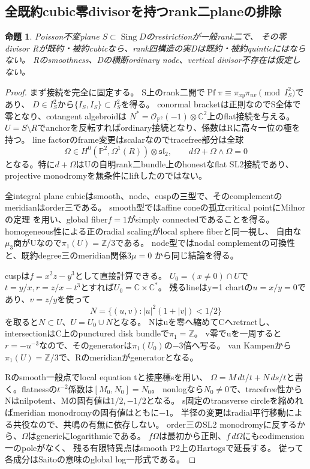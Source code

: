 \documentclass[a4paper,11pt]{ltjsarticle}
\newtheorem{proposition}{命題}[section]
\theoremstyle{definition}
\begin{document}
\subsection{全既約cubic零divisorを持つrank二planeの排除}
\begin{proposition}\label{prop:rank2-plane-integral-cubic}
Poisson不変plane $S\subset\operatorname{Sing}D$のrestrictionが一般rank二で、
その零divisor Rが既約・被約cubicなら、rank四構造の実Dは既約・被約quinticにはならない。
Rのsmoothness、Dの横断ordinary node、vertical divisor不存在は仮定しない。
\end{proposition}
\begin{proof}
まず接続を完全に固定する。
S上のrank二開で$\operatorname{Pf}\pi\equiv\pi_{xy}\pi_{uv}\pmod{I_S^2}$であり、
$D\in I_S^2$から$\{I_S,I_S\}\subset I_S^2$を得る。
conormal bracketは正則なのでS全体で零となり、cotangent algebroidは
$N^*=\mathcal O_{\mathbb P^2}(-1)\otimes\mathbb C^2$上のflat接続を与える。
$U=S\setminus R$でanchorを反転すればordinary接続となり、係数はRに高々一位の極を持つ。
line factorのframe変更はscalarなのでtracefree部分は全球
\[
 \Omega\in H^0(\mathbb P^2,\Omega^1(R))\otimes\mathfrak{sl}_2,
 \qquad d\Omega+\Omega\wedge\Omega=0
\]
となる。特に$d+\Omega$はUの自明rank二bundle上のhonestなflat SL2接続であり、
projective monodromyを無条件にliftしたのではない。

全integral plane cubicはsmooth、node、cuspの三型で、そのcomplementのmeridianはorder三である。
smooth型ではaffine coneの孤立critical pointにMilnorの定理\cite[Theorem 6.5, pp.57--58]{milnor}
を用い、global fiber$f=1$がsimply connectedであることを得る。
homogeneous性による正のradial scalingがlocal sphere fiberと同一視し、
自由な$\mu_3$商がUなので$\pi_1(U)=\mathbb Z/3$である。
node型ではnodal complementの可換性と、既約degree三のmeridian関係$3\mu=0$
\cite[\S3, Proposition 3.1の証明, pp.5--6]{artaldimca}から同じ結論を得る。

cuspは$f=x^2z-y^3$として直接計算できる。
$U_0=(x\ne0)\cap U$で$t=y/x,r=z/x-t^3$とすれば$U_0=\mathbb C\times\mathbb C^*$。
残るlineはy=1 chartの$u=x/y=0$であり、$v=z/y$を使って
\[
 N=\{(u,v):|u|^2(1+|v|)<1/2\}
\]
を取ると$N\subset U$、$U=U_0\cup N$となる。
Nはuを零へ縮めてCへretractし、intersectionはC上のpunctured disk bundleで$\pi_1=\mathbb Z$。
v零でuを一周すると$r=-u^{-3}$なので、そのgeneratorは$\pi_1(U_0)$の$-3$倍へ写る。
van Kampenから$\pi_1(U)=\mathbb Z/3$で、Rのmeridianがgeneratorとなる。

Rのsmooth一般点でlocal equation tと接座標sを用い、
$\Omega=M\,dt/t+N\,ds/t$と書く。flatnessの$t^{-2}$係数は$[M_0,N_0]=N_0$。
nonlogなら$N_0\ne0$で、tracefree性からNはnilpotent、Mの固有値は$1/2,-1/2$となる。
s固定のtransverse circleを縮めればmeridian monodromyの固有値はともに$-1$。
半径の変更はradial平行移動による共役なので、共鳴の有無に依存しない。
order三のSL2 monodromyに反するから、$\Omega$はgenericにlogarithmicである。
$f\Omega$は最初から正則、$f\,d\Omega$にもcodimension一のpoleがなく、
残る有限特異点はsmooth P2上のHartogsで延長する。
従って各成分はSaitoの意味のglobal log一形式である。


\end{proof}
\end{document}
